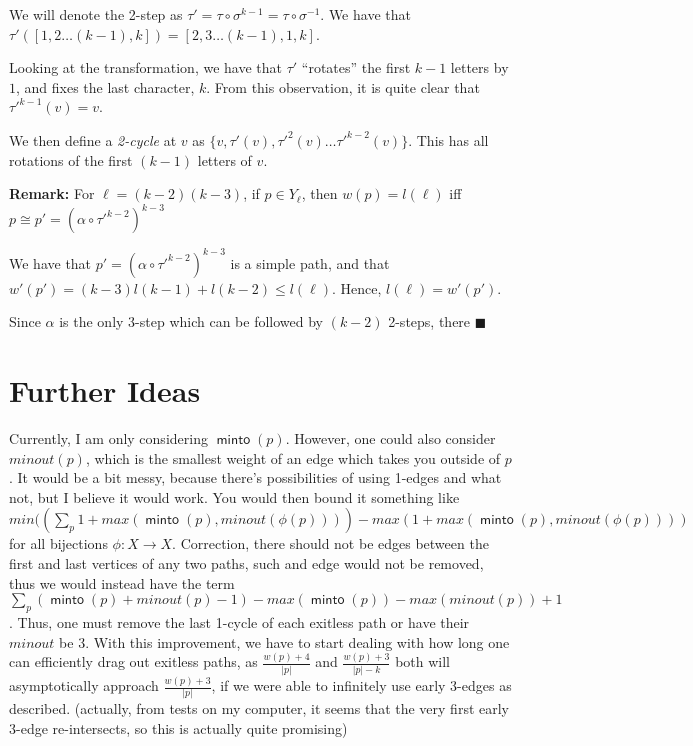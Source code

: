 \documentclass{article}
\DeclareMathOperator{\minto}{\bm{\mathsf{minto}}}
\newcommand{\edit}[1]{}%
\newcommand{\rough}[1]{}%
\begin{document}
We will denote the 2-step as $\tau' = \tau \circ \sigma^{k-1} = \tau \circ \sigma^{-1}$.\edit{ does it make more sense to use $\tau'$ or a new letter; is the $\sigma^{-1}$ useful?} We have that $\tau'([1,2\dots (k-1),k]) = [2,3\dots (k-1),1,k]$.

\vspace{1.75em}

Looking at the transformation, we have that $\tau'$ ``rotates'' the first $k-1$ letters by $1$, and fixes the last character, $k$. From this observation, it is quite clear that $\tau'^{k-1}(v) = v$. 

We then define a \textit{2-cycle} at $v$ as $\{v, \tau'(v), \tau'^2(v) \dots \tau'^{k-2}(v)\}$. This has all rotations of the first $(k-1)$ letters of $v$.\edit{ prove/explain, reference Williams paper}

\rough{$l(k-2) = k-3, l_2(k-2) = k-2, l(k-1) = k-1$}\edit{ requires editing $w'$}


\rough{LEMMA SETUP}\textbf{Remark:} For $\ell = (k-2)(k-3)$, if $p \in Y_{\ell}$, then $w(p) = l(\ell)$ iff $p \cong p' = (\alpha \circ \tau'^{k-2})^{k-3}$\edit{ define $\alpha, \cong$, and writing a path like that}

\vspace{1.75em}

We have that $p' = (\alpha \circ \tau'^{k-2})^{k-3}$ is a simple path, and that $w'(p') = (k-3)l(k-1)+l(k-2) \leq l(\ell)$. Hence, $l(\ell) = w'(p')$.\edit{ show/explain the cycle}

\vspace{1.75em}

\rough{SHOW $p \ncong p' \in Y_\ell, w(p') > p$}

Since $\alpha$ is the only 3-step which can be followed by $(k-2)$ 2-steps, there
$\blacksquare$




\section{Further Ideas}

Currently, I am only considering $\minto(p)$. However, one could also consider $minout(p)$, which is the smallest weight of an edge which takes you outside of $p$. It would be a bit messy, because there's possibilities of using 1-edges and what not, but I believe it would work. You would then bound it something like $min( \left(\sum_p 1+max( \minto(p), minout(\phi(p))) \right) - max( 1+max(\minto(p),minout(\phi(p))) )$ for all bijections $\phi: X \to X$. Correction, there should not be edges between the first and last vertices of any two paths, such and edge would not be removed, thus we would instead have the term $\sum_p (\minto(p) + minout(p) -1) - max(\minto(p))-max(minout(p))+1$. Thus, one must remove the last 1-cycle of each exitless path or have their $minout$ be 3. With this improvement, we have to start dealing with how long one can efficiently drag out exitless paths, as $\frac{w(p) + 4}{|p|}$ and $\frac{w(p)+3}{|p|-k}$ both will asymptotically approach $\frac{w(p) + 3}{|p|}$, if we were able to infinitely use early 3-edges as described. (actually, from tests on my computer, it seems that the very first early 3-edge re-intersects, so this is actually quite promising)
\end{document}
